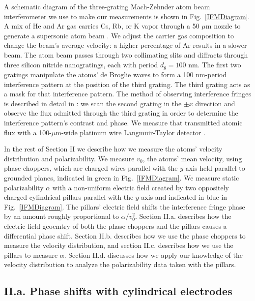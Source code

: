 \documentclass[twocolumn,prl,showpacs,superscriptaddress,longbibliography]{revtex4-1}   %
\newcommand{\figref}[1]{Fig.~\ref{#1}}
\begin{document}
A schematic diagram of the three-grating Mach-Zehnder atom beam interferometer we use to make our measurements is shown in \figref{IFMDiagram}. 
A mix of He and Ar gas carries Cs, Rb, or K vapor through a 50 $\mu$m nozzle to generate a supersonic atom beam \cite{Scoles}\cite{Ekstrom1993}. We adjust the carrier gas composition to change the beam's average velocity: a higher percentage of Ar results in a slower beam.
The atom beam passes through two collimating slits and diffracts through three silicon nitride nanogratings, each with period $d_g = 100$ nm.
The first two gratings manipulate the atoms' de Broglie waves to form a 100 nm-period interference pattern at the position of the third grating. 
The third grating acts as a mask for that interference pattern. 
The method of observing interference fringes is described in detail in \cite{Kokorowski2001}: we scan the second grating in the $\pm x$ direction and observe the flux admitted through the third grating in order to determine the interference pattern's contrast and phase.
We measure that transmitted atomic flux with a 100-$\mu$m-wide platinum wire Langmuir-Taylor detector \cite{Delhuille2002}.

In the rest of Section II we describe how we measure the atoms' velocity distribution and polarizability.
We measure $v_0$, the atoms' mean velocity, using phase choppers, which are charged wires parallel with the $y$ axis held parallel to grounded planes, indicated in green in \figref{IFMDiagram}.
We measure static polarizability $\alpha$ with a non-uniform electric field created by two oppositely charged cylindrical pillars parallel with the $y$ axis and indicated in blue in \figref{IFMDiagram}. The pillars' electric field shifts the interference fringe phase by an amount roughly proportional to $\alpha/v_0^2$. 
Section II.a. describes how the electric field geoemtry of both the phase choppers and the pillars causes a differential phase shift. Section II.b. describes how we use the phase choppers to measure the velocity distribution, and section II.c. describes how we use the pillars to measure $\alpha$. Section II.d. discusses how we apply our knowledge of the velocity distribution to analyze the polarizability data taken with the pillars.


\subsection{II.a. Phase shifts with cylindrical electrodes}
\end{document}
